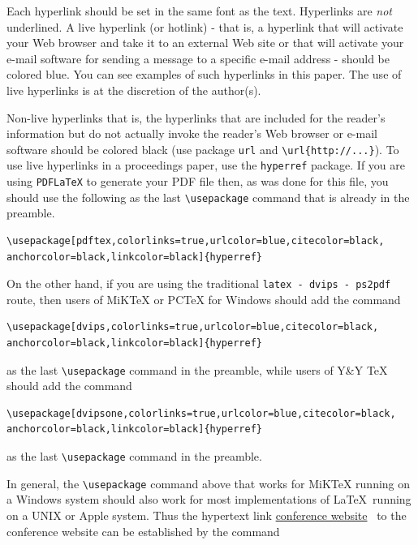 \documentclass{scspaperproc}
\theoremstyle{scsthe}
\begin{document}
Each hyperlink should be set in the same font as the text. Hyperlinks are \emph{not} underlined. A live hyperlink (or hotlink) - that is, a hyperlink that will activate your Web browser and take it to an external Web site or that will activate your e-mail software for sending a message to a specific e-mail address - should be colored blue. You can see examples of such hyperlinks in this paper. The use of live hyperlinks is at the discretion of the author(s).

Non-live hyperlinks that is, the hyperlinks that are included for the reader’s information but do not actually invoke the reader’s Web browser or e-mail software should be colored black (use package \texttt{url} and \verb+\url{http://...}+). To use live hyperlinks in a proceedings paper, use the \texttt{hyperref} package. If you are using \texttt{PDFLaTeX} to generate your PDF file then, as was done for this file, you should use the following as the last \verb+\usepackage+ command that is already in the preamble.

\begin{verbatim}
\usepackage[pdftex,colorlinks=true,urlcolor=blue,citecolor=black,
anchorcolor=black,linkcolor=black]{hyperref}
\end{verbatim}

On the other hand, if you are using the traditional \texttt{latex - dvips - ps2pdf} route, then users of MiKTeX or PCTeX for Windows should add the command

\begin{verbatim}
\usepackage[dvips,colorlinks=true,urlcolor=blue,citecolor=black,
anchorcolor=black,linkcolor=black]{hyperref}
\end{verbatim}

as the last \verb+\usepackage+ command in the preamble, while users of Y\&Y TeX should add the command

\begin{verbatim}
\usepackage[dvipsone,colorlinks=true,urlcolor=blue,citecolor=black,
anchorcolor=black,linkcolor=black]{hyperref}
\end{verbatim}

as the last \verb+\usepackage+ command in the preamble.

In general, the \verb+\usepackage+ command above that works for MiKTeX running on a Windows system should also work for most implementations of \LaTeX\ running on a UNIX or Apple system.
Thus the hypertext link \href{http://www.scs.org}{conference website}~\cite{SCS} to the conference website can be established by the command
\end{document}
